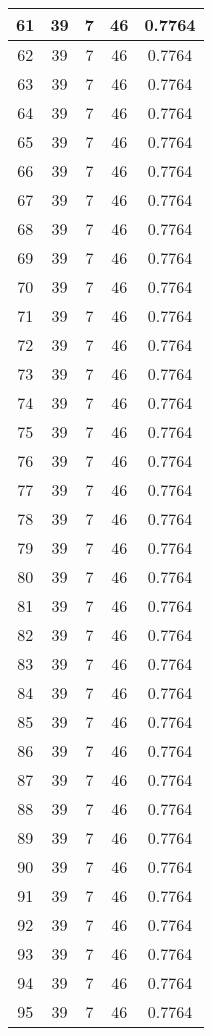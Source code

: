 \documentclass[letterpaper, 12pt]{article}
\begin{document}
\begin{longtable}{|c|c|c|c|c|}
61 & 39 & 7 & 46 & 0.7764 \\
\hline
62 & 39 & 7 & 46 & 0.7764 \\
\hline
63 & 39 & 7 & 46 & 0.7764 \\
\hline
64 & 39 & 7 & 46 & 0.7764 \\
\hline
65 & 39 & 7 & 46 & 0.7764 \\
\hline
66 & 39 & 7 & 46 & 0.7764 \\
\hline
67 & 39 & 7 & 46 & 0.7764 \\
\hline
68 & 39 & 7 & 46 & 0.7764 \\
\hline
69 & 39 & 7 & 46 & 0.7764 \\
\hline
70 & 39 & 7 & 46 & 0.7764 \\
\hline
71 & 39 & 7 & 46 & 0.7764 \\
\hline
72 & 39 & 7 & 46 & 0.7764 \\
\hline
73 & 39 & 7 & 46 & 0.7764 \\
\hline
74 & 39 & 7 & 46 & 0.7764 \\
\hline
75 & 39 & 7 & 46 & 0.7764 \\
\hline
76 & 39 & 7 & 46 & 0.7764 \\
\hline
77 & 39 & 7 & 46 & 0.7764 \\
\hline
78 & 39 & 7 & 46 & 0.7764 \\
\hline
79 & 39 & 7 & 46 & 0.7764 \\
\hline
80 & 39 & 7 & 46 & 0.7764 \\
\hline
81 & 39 & 7 & 46 & 0.7764 \\
\hline
82 & 39 & 7 & 46 & 0.7764 \\
\hline
83 & 39 & 7 & 46 & 0.7764 \\
\hline
84 & 39 & 7 & 46 & 0.7764 \\
\hline
85 & 39 & 7 & 46 & 0.7764 \\
\hline
86 & 39 & 7 & 46 & 0.7764 \\
\hline
87 & 39 & 7 & 46 & 0.7764 \\
\hline
88 & 39 & 7 & 46 & 0.7764 \\
\hline
89 & 39 & 7 & 46 & 0.7764 \\
\hline
90 & 39 & 7 & 46 & 0.7764 \\
\hline
91 & 39 & 7 & 46 & 0.7764 \\
\hline
92 & 39 & 7 & 46 & 0.7764 \\
\hline
93 & 39 & 7 & 46 & 0.7764 \\
\hline
94 & 39 & 7 & 46 & 0.7764 \\
\hline
95 & 39 & 7 & 46 & 0.7764 \\

\end{longtable}
\end{document}
